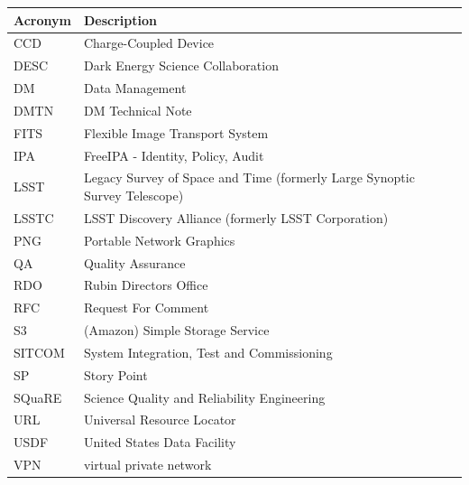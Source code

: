 \addtocounter{table}{-1}
\begin{longtable}{p{}p{}}\hline
\textbf{Acronym} & \textbf{Description}  \\\hline

CCD & Charge-Coupled Device \\\hline
DESC & Dark Energy Science Collaboration \\\hline
DM & Data Management \\\hline
DMTN & DM Technical Note \\\hline
FITS & Flexible Image Transport System \\\hline
IPA & FreeIPA - Identity, Policy, Audit \\\hline
LSST & Legacy Survey of Space and Time (formerly Large Synoptic Survey Telescope) \\\hline
LSSTC & LSST Discovery Alliance (formerly LSST Corporation) \\\hline
PNG & Portable Network Graphics \\\hline
QA & Quality Assurance \\\hline
RDO & Rubin Directors Office \\\hline
RFC & Request For Comment \\\hline
S3 & (Amazon) Simple Storage Service \\\hline
SITCOM & System Integration, Test and Commissioning \\\hline
SP & Story Point \\\hline
SQuaRE & Science Quality and Reliability Engineering \\\hline
URL & Universal Resource Locator \\\hline
USDF & United States Data Facility \\\hline
VPN & virtual private network \\\hline
\end{longtable}
